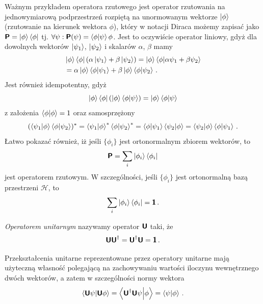 \documentclass{myclass}
\begin{document}
Ważnym przykładem operatora rzutowego jest operator rzutowania na jednowymiarową podprzestrzeń
rozpiętą na unormowanym wektorze \(\ket{\phi}\) (rzutowanie na kierunek wektora \(\phi\)), który w
notacji Diraca możemy zapisać jako \(\boldsymbol{\mathsf{P}} = \ket{\phi}\bra{\phi}\) tj. \(\forall \psi :
\boldsymbol{\mathsf{P}}(\psi) = \braket{\phi}{\psi}\phi\). Jest to oczywiście operator liniowy, gdyż dla dowolnych
wektorów \(\ket{\psi_1}\), \(\ket{\psi_2}\) i skalarów \(\alpha\), \(\beta\) mamy
\begin{equation*}
    \begin{split}
        &\ket{\phi}\bra{\phi}(\alpha\ket{\psi_1} + \beta\ket{\psi_2}) = \ket{\phi}\braket{\phi}{\alpha\psi_1 + \beta\psi_2} \\
        &= \alpha\ket{\phi} \braket{\phi}{\psi_1} + \beta\ket{\phi}\braket{\phi}{\psi_2}\,.
    \end{split}
\end{equation*}
Jest również idempotentny, gdyż 
\begin{equation*}
    \ket{\phi}\bra{\phi}(\ket{\phi}\braket{\phi}{\psi}) =  \ket{\phi}\braket{\phi}{\psi}
\end{equation*}
z założenia \(\braket{\phi} = 1\) oraz samosprzężony
\begin{equation*}
    (\braket{\psi_1}{\phi}\braket{\phi}{\psi_2})^* = \braket{\psi_1}{\phi}^*\braket{\phi}{\psi_2}^* = \braket{\phi}{\psi_1}\braket{\psi_2}{\phi} = \braket{\psi_2}{\phi}\braket{\phi}{\psi_1}\,.
\end{equation*}
Łatwo pokazać również, iż jeśli \(\{\phi_i\}\) jest ortonormalnym zbiorem wektorów, to
\begin{equation*}
    \boldsymbol{\mathsf{P}} = \sum_i \ket{\phi_i}\bra{\phi_i}
\end{equation*}
jest operatorem rzutowym. W szczególności, jeśli \(\{\phi_i\}\) jest ortonormalną bazą przestrzeni
\(\mathscr{H}\), to
\begin{equation*}
    \sum_i \ket{\phi_i}\bra{\phi_i} = \boldsymbol{\mathsf{1}}\,.
\end{equation*}

\linesep

\begin{definition}
\textit{Operatorem unitarnym} nazywamy operator \(\boldsymbol{\mathsf{U}}\) taki, że
\begin{equation*}
    \boldsymbol{\mathsf{U}}\boldsymbol{\mathsf{U}}^\dagger = \boldsymbol{\mathsf{U}}^\dagger\boldsymbol{\mathsf{U}} = \boldsymbol{\mathsf{1}}\,.
\end{equation*}
\end{definition}

Przekształcenia unitarne reprezentowane przez operatory unitarne mają użyteczną własność polegającą
na zachowywaniu wartości iloczynu wewnętrznego dwóch wektorów, a zatem w szczególności normy wektora
\begin{equation*}
    \braket{\boldsymbol{\mathsf{U}}\psi}{\boldsymbol{\mathsf{U}}\phi} = \braket{\boldsymbol{\mathsf{U}}^\dagger\boldsymbol{\mathsf{U}}\psi}{\phi} = \braket{\psi}{\phi}\,.
\end{equation*}
\end{document}
